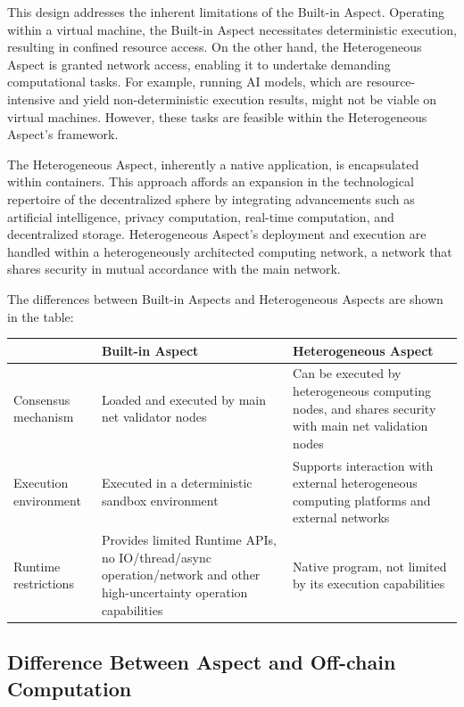 This design addresses the inherent limitations of the Built-in Aspect. Operating within a virtual machine, the Built-in Aspect necessitates deterministic execution, resulting in confined resource access. On the other hand, the Heterogeneous Aspect is granted network access, enabling it to undertake demanding computational tasks. For example, running AI models, which are resource-intensive and yield non-deterministic execution results, might not be viable on virtual machines. However, these tasks are feasible within the Heterogeneous Aspect's framework.

The Heterogeneous Aspect, inherently a native application, is encapsulated within containers. This approach affords an expansion in the technological repertoire of the decentralized sphere by integrating advancements such as artificial intelligence, privacy computation, real-time computation, and decentralized storage. Heterogeneous Aspect's deployment and execution are handled within a heterogeneously architected computing network, a network that shares security in mutual accordance with the main network.

The differences between Built-in Aspects and Heterogeneous Aspects are shown in the table:

\begin{table}[htbp]
    \centering
    \begin{tabular}{|l|p{6cm}|p{6cm}|}
      \hline
      & Built-in Aspect & Heterogeneous Aspect \\
      \hline
      Consensus mechanism & Loaded and executed by main net validator nodes & Can be executed by heterogeneous computing nodes, and shares security with main net validation nodes \\
      \hline
      Execution environment & Executed in a deterministic sandbox environment & Supports interaction with external heterogeneous computing platforms and external networks \\
      \hline
      Runtime restrictions & Provides limited Runtime APIs, no IO/thread/async operation/network and other high-uncertainty operation capabilities & Native program, not limited by its execution capabilities \\
      \hline
    \end{tabular}
  \end{table}
  


\subsection{Difference Between Aspect and Off-chain Computation}

